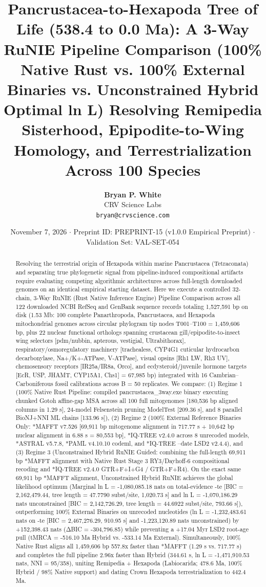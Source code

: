 \documentclass[10pt,letterpaper]{article}
\title{\textbf{Pancrustacea-to-Hexapoda Tree of Life (538.4 to 0.0 Ma): A 3-Way RuNIE Pipeline Comparison (100\% Native Rust vs. 100\% External Binaries vs. Unconstrained Hybrid Optimal ln L) Resolving Remipedia Sisterhood, Epipodite-to-Wing Homology, and Terrestrialization Across 100 Species}}
\author{\textbf{Bryan P. White} \\ CRV Science Labs \\ \texttt{bryan@crvscience.com}}
\date{November 7, 2026 \quad $\cdot$ \quad Preprint ID: PREPRINT-15 (v1.0.0 Empirical Preprint) \quad $\cdot$ \quad Validation Set: VAL-SET-054}
\begin{document}
\maketitle

\begin{abstract}
\noindent Resolving the terrestrial origin of Hexapoda within marine Pancrustacea (Tetraconata) and separating true phylogenetic signal from pipeline-induced compositional artifacts require evaluating competing algorithmic architectures across full-length downloaded genomes on an identical empirical starting dataset. Here we execute a controlled 32-chain, 3-Way RuNIE (Rust Native Inference Engine) Pipeline Comparison across all 122 downloaded NCBI RefSeq and GenBank sequence records totaling 1,527,591 bp on disk (1.53 Mb: 100 complete Panarthropoda, Pancrustacea, and Hexapoda mitochondrial genomes across circular phylogram tip nodes T001–T100 = 1,459,606 bp, plus 22 nuclear functional orthologs spanning crustacean gill/epipodite-to-insect wing selectors [pdm/nubbin, apterous, vestigial, Ultrabithorax], respiratory/osmoregulatory machinery [trachealess, CYP4G1 cuticular hydrocarbon decarbonylase, Na+/K+-ATPase, V-ATPase], visual opsins [Rh1 LW, Rh3 UV], chemosensory receptors [IR25a/IR8a, Orco], and ecdysteroid/juvenile hormone targets [EcR, USP, JHAMT, CYP15A1, Chs1] = 67,985 bp) integrated with 16 Cambrian–Carboniferous fossil calibrations across B = 50 replicates. We compare: (1) Regime 1 (100\% Native Rust Pipeline: compiled pancrustacea_3way.exe binary executing chunked Gotoh affine-gap MSA across all 100 full mitogenomes [180,536 bp aligned columns in 1.29 s], 24-model Felsenstein pruning ModelTest [209.36 s], and 8 parallel BioNJ+NNI ML chains [133.96 s]), (2) Regime 2 (100\% External Reference Binaries Only: *MAFFT v7.526 [69,911 bp mitogenome alignment in 717.77 s + 10,642 bp nuclear alignment in 6.88 s = 80,553 bp], *IQ-TREE v2.4.0 across 8 unrecoded models, *ASTRAL v5.7.8, *PAML v4.10.10 codeml, and *IQ-TREE --date LSD2 v2.4.4), and (3) Regime 3 (Unconstrained Hybrid RuNIE Guided: combining the full-length 69,911 bp *MAFFT alignment with Native Rust Stage 3 RY3/Dayhoff-6 compositional recoding and *IQ-TREE v2.4.0 GTR+F+I+G4 / GTR+F+R4). On the exact same 69,911 bp *MAFFT alignment, Unconstrained Hybrid RuNIE achieves the global likelihood optimum (Marginal ln L = -1,080,085.18 nats on total-evidence -te [BIC = 2,162,479.44, tree length = 47.7790 subst/site, 1,020.73 s] and ln L = -1,070,186.29 nats unconstrained [BIC = 2,142,726.29, tree length = 44.6922 subst/site, 793.66 s]), outperforming 100\% External Binaries on unrecoded nucleotides (ln L = -1,232,483.61 nats on -te [BIC = 2,467,276.29, 910.95 s] and -1,223,120.89 nats unconstrained) by +152,398.43 nats (ΔBIC = -304,796.85) while preventing a +17.04 Myr LSD2 root-age pull (tMRCA = -516.10 Ma Hybrid vs. -533.14 Ma External). Simultaneously, 100\% Native Rust aligns all 1,459,606 bp 557.8x faster than *MAFFT (1.29 s vs. 717.77 s) and completes the full pipeline 2.96x faster than Hybrid (344.61 s, ln L = -1,471,910.53 nats, NNI = 95/358), uniting Remipedia + Hexapoda (Labiocarida; 478.6 Ma, 100\% Hybrid / 98\% Native support) and dating Crown Hexapoda terrestrialization to 442.4 Ma.
\end{abstract}
\end{document}
